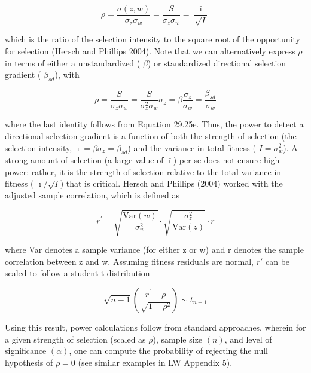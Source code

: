\documentclass{article}
\begin{document}
\begin{equation}
\rho=\frac{\sigma(z,w)}{\sigma_{z}\sigma_{w}}=\frac{S}{\sigma_{z}\sigma_{w}}=\frac{\bar{\imath}}{\sqrt{I}}
\tag{29.32a}
\label{eq:29_32a}
\end{equation}

which is the ratio of the selection intensity to the square root of the opportunity for selection (Hersch and Phillips 2004). Note that we can alternatively express  $ \rho $ in terms of either a unstandardized ( $ \beta $) or standardized directional selection gradient ( $ \beta_{sd} $), with

\begin{equation}
\rho=\frac{S}{\sigma_{z}\sigma_{w}}=\frac{S}{\sigma_{z}^{2}\sigma_{w}}\sigma_{z}=\beta\frac{\sigma_{z}}{\sigma_{w}}=\frac{\beta_{sd}}{\sigma_{w}}
\tag{29.32b}
\label{eq:29_32b}
\end{equation}

where the last identity follows from Equation 29.25e. Thus, the power to detect a directional selection gradient is a function of both the strength of selection (the selection intensity,  $ \bar{\imath} = \beta \sigma_z = \beta_{sd} $) and the variance in total fitness ( $ I = \sigma_w^2 $). A strong amount of selection (a large value of  $ \bar{\imath} $) per se does not ensure high power: rather, it is the strength of selection relative to the total variance in fitness ( $ \bar{\imath}/\sqrt{I} $) that is critical. Hersch and Phillips (2004) worked with the adjusted sample correlation, which is defined as

\begin{equation}
r^{\prime}=\sqrt{\frac{\mathrm{Var}(w)}{\sigma_{w}^{2}}}\cdot\sqrt{\frac{\sigma_{z}^{2}}{\mathrm{Var}(z)}}\cdot r
\tag{29.32c}
\label{eq:29_32c}
\end{equation}

where Var denotes a sample variance (for either z or w) and r denotes the sample correlation between z and w. Assuming fitness residuals are normal,  $ r' $ can be scaled to follow a student-t distribution

\begin{equation}
\sqrt{n-1}\left(\frac{r^{\prime}-\rho}{\sqrt{1-\rho^{2}}}\right)\sim t_{n-1}
\tag{29.32d}
\label{eq:29_32d}
\end{equation}

Using this result, power calculations follow from standard approaches, wherein for a given strength of selection (scaled as  $ \rho $), sample size  $ (n) $, and level of significance  $ (\alpha) $, one can compute the probability of rejecting the null hypothesis of  $ \rho = 0 $ (see similar examples in LW Appendix 5).
\end{document}
